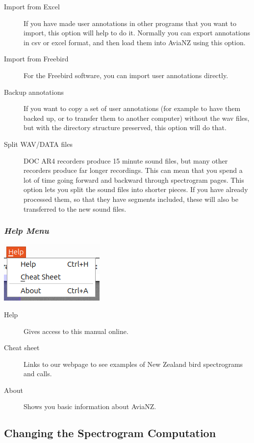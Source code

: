 \documentclass{article}
\begin{document}
\begin{description}
\item [Import from Excel] If you have made user annotations in other programs that you want to import, this option will help to do it. Normally you can export annotations in csv or excel format, and then load them into AviaNZ using this option.
\item [Import from Freebird] For the Freebird software, you can import user annotations directly.
\item[Backup annotations] If you want to copy a set of user annotations (for example to have them backed up, or to transfer them to another computer) without the wav files, but with the directory structure preserved, this option will do that. 
\item[Split WAV/DATA files] DOC AR4 recorders produce 15 minute sound files, but many other recorders produce far longer recordings. This can mean that you spend a lot of time going forward and backward through spectrogram pages. This option lets you split the sound files into shorter pieces. If you have already processed them, so that they have segments included, these will also be transferred to the new sound files.
\end{description}

\subsubsection{{\em Help Menu}}

\begin{center}
\includegraphics[width=.2\textwidth]{Figures/HelpMenu}
\end{center}

\begin{description}
\item [Help] Gives access to this manual online.
\item [Cheat sheet] Links to our webpage to see examples of New Zealand bird spectrograms and calls.
\item[About] Shows you basic information about AviaNZ.
\end{description}

\subsection{Changing the Spectrogram Computation}\label{sec:spectrogram2}
\end{document}
